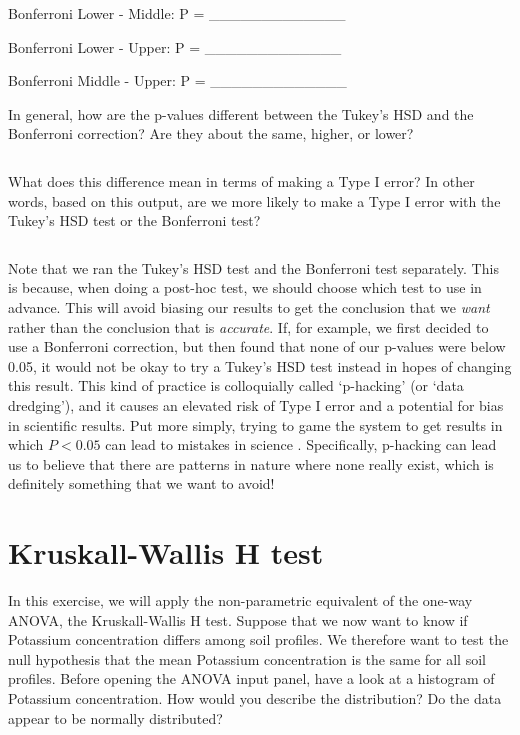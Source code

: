 \documentclass[
  openany]{krantz}
\begin{document}
Bonferroni Lower - Middle: P = \_\_\_\_\_\_\_\_\_\_\_\_\_

Bonferroni Lower - Upper: P = \_\_\_\_\_\_\_\_\_\_\_\_\_

Bonferroni Middle - Upper: P = \_\_\_\_\_\_\_\_\_\_\_\_\_

In general, how are the p-values different between the Tukey's HSD and the Bonferroni correction?
Are they about the same, higher, or lower?

\begin{verbatim}
\end{verbatim}

What does this difference mean in terms of making a Type I error?
In other words, based on this output, are we more likely to make a Type I error with the Tukey's HSD test or the Bonferroni test?

\begin{verbatim}

\end{verbatim}

Note that we ran the Tukey's HSD test and the Bonferroni test separately.
This is because, when doing a post-hoc test, we should choose which test to use in advance.
This will avoid biasing our results to get the conclusion that we \emph{want} rather than the conclusion that is \emph{accurate}.
If, for example, we first decided to use a Bonferroni correction, but then found that none of our p-values were below 0.05, it would not be okay to try a Tukey's HSD test instead in hopes of changing this result.
This kind of practice is colloquially called `p-hacking' (or `data dredging'), and it causes an elevated risk of Type I error and a potential for bias in scientific results.
Put more simply, trying to game the system to get results in which \(P < 0.05\) can lead to mistakes in science \citep{Head2015}.
Specifically, p-hacking can lead us to believe that there are patterns in nature where none really exist, which is definitely something that we want to avoid!

\hypertarget{kruskall-wallis-h-test}{%
\section{Kruskall-Wallis H test}\label{kruskall-wallis-h-test}}

In this exercise, we will apply the non-parametric equivalent of the one-way ANOVA, the Kruskall-Wallis H test.
Suppose that we now want to know if Potassium concentration differs among soil profiles.
We therefore want to test the null hypothesis that the mean Potassium concentration is the same for all soil profiles.
Before opening the ANOVA input panel, have a look at a histogram of Potassium concentration.
How would you describe the distribution?
Do the data appear to be normally distributed?
\end{document}
